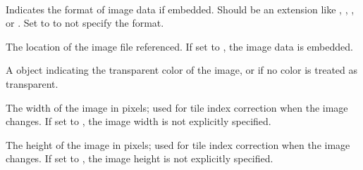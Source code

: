 \documentclass[letterpaper,10pt,english]{sphinxmanual}
\begin{document}

\begin{fulllineitems}
\label{index:tmx.Image}~

\begin{fulllineitems}
\label{index:tmx.Image.format}
Indicates the format of image data if embedded.  Should be an
extension like , , , or .
Set to  to not specify the format.

\end{fulllineitems}


\begin{fulllineitems}
\label{index:tmx.Image.source}
The location of the image file referenced.  If set to
, the image data is embedded.

\end{fulllineitems}


\begin{fulllineitems}
\label{index:tmx.Image.trans}
A {\hyperref[index:tmx.Color]{\emph{}}} object indicating the transparent color of the
image, or  if no color is treated as transparent.

\end{fulllineitems}


\begin{fulllineitems}
\label{index:tmx.Image.width}
The width of the image in pixels; used for tile index correction
when the image changes.  If set to , the image width
is not explicitly specified.

\end{fulllineitems}


\begin{fulllineitems}
\label{index:tmx.Image.height}
The height of the image in pixels; used for tile index correction
when the image changes.  If set to , the image
height is not explicitly specified.


\end{fulllineitems}
\end{fulllineitems}
\end{document}
